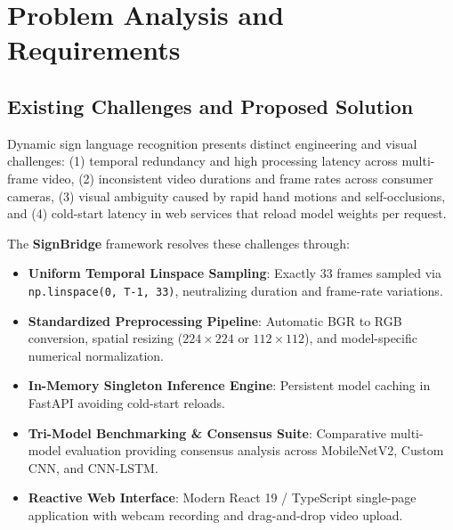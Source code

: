 \chapter{Problem Analysis and Requirements}
\label{ch:requirements}

\section{Existing Challenges and Proposed Solution}
\label{sec:challenges_solution}
Dynamic sign language recognition presents distinct engineering and visual challenges: (1) temporal redundancy and high processing latency across multi-frame video, (2) inconsistent video durations and frame rates across consumer cameras, (3) visual ambiguity caused by rapid hand motions and self-occlusions, and (4) cold-start latency in web services that reload model weights per request.

The \textbf{SignBridge} framework resolves these challenges through:
\begin{itemize}
    \item \textbf{Uniform Temporal Linspace Sampling}: Exactly 33 frames sampled via \texttt{np.linspace(0, T-1, 33)}, neutralizing duration and frame-rate variations.
    \item \textbf{Standardized Preprocessing Pipeline}: Automatic BGR to RGB conversion, spatial resizing ($224\times224$ or $112\times112$), and model-specific numerical normalization.
    \item \textbf{In-Memory Singleton Inference Engine}: Persistent model caching in FastAPI avoiding cold-start reloads.
    \item \textbf{Tri-Model Benchmarking & Consensus Suite}: Comparative multi-model evaluation providing consensus analysis across MobileNetV2, Custom CNN, and CNN-LSTM.
    \item \textbf{Reactive Web Interface}: Modern React 19 / TypeScript single-page application with webcam recording and drag-and-drop video upload.
\end{itemize}

